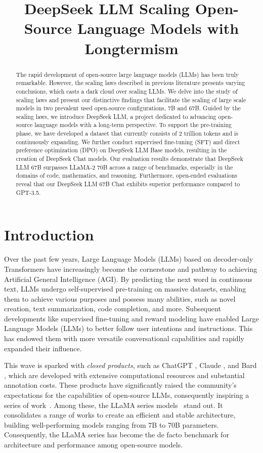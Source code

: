\title{DeepSeek LLM Scaling Open-Source Language Models with Longtermism}

\begin{abstract}
The rapid development of open-source large language models (LLMs) has been truly remarkable. However, the scaling laws described in previous literature presents varying conclusions, which casts a dark cloud over scaling LLMs. We delve into the study of scaling laws and present our distinctive findings that facilitate the scaling of large scale models in two prevalent used open-source configurations, 7B and 67B. Guided by the scaling laws, we introduce DeepSeek LLM, a project dedicated to advancing open-source language models with a long-term perspective. To support the pre-training phase, we have developed a dataset that currently consists of 2 trillion tokens and is continuously expanding.  We further conduct supervised fine-tuning (SFT) and direct preference optimization (DPO) on DeepSeek LLM Base models, resulting in the creation of DeepSeek Chat models. Our evaluation results demonstrate that DeepSeek LLM 67B surpasses LLaMA-2 70B across a range of benchmarks, especially in the domains of code, mathematics, and reasoning. Furthermore, open-ended evaluations reveal that our DeepSeek LLM 67B Chat exhibits superior performance compared to GPT-3.5.
\end{abstract}

\section{Introduction}
Over the past few years, Large Language Models (LLMs) based on decoder-only Transformers \citep{transformer} have increasingly become the cornerstone and pathway to achieving Artificial General Intelligence (AGI). By predicting the next word in continuous text, LLMs undergo self-supervised pre-training on massive datasets, enabling them to achieve various purposes and possess many abilities, such as novel creation, text summarization, code completion, and more. Subsequent developments like supervised fine-tuning and reward modeling have enabled Large Language Models (LLMs) to better follow user intentions and instructions. This has endowed them with more versatile conversational capabilities and rapidly expanded their influence.

This wave is sparked with \emph{closed products},  such as ChatGPT \citep{chatgpt}, Claude \citep{claude}, and Bard \citep{bard}, which are developed with extensive computational resources and substantial annotation costs. These products have significantly raised the community's expectations for the capabilities of open-source LLMs, consequently inspiring a series of work~\citep{glm,llama,llama2,qwen,baichuan2,mistral}. Among these, the LLaMA series models~\citep{llama, llama2} stand out. It consolidates a range of works to create an efficient and stable architecture, building well-performing models ranging from 7B to 70B parameters. Consequently, the LLaMA series has become the de facto benchmark for architecture and performance among open-source models.


